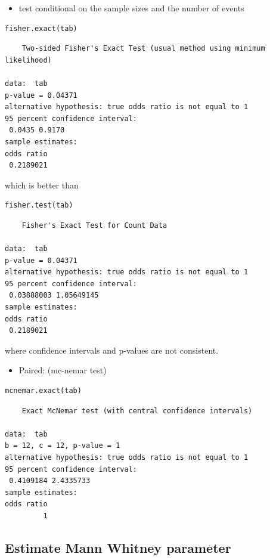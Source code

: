 \documentclass{article}
\begin{document}
\bigskip

\begin{itemize}
\item test conditional on the sample sizes and the number of events
\end{itemize}
\lstset{language=r,label= ,caption= ,captionpos=b,numbers=none}
\begin{lstlisting}
fisher.exact(tab)
\end{lstlisting}

\begin{verbatim}
	Two-sided Fisher's Exact Test (usual method using minimum likelihood)

data:  tab
p-value = 0.04371
alternative hypothesis: true odds ratio is not equal to 1
95 percent confidence interval:
 0.0435 0.9170
sample estimates:
odds ratio 
 0.2189021
\end{verbatim}

which is better than
\lstset{language=r,label= ,caption= ,captionpos=b,numbers=none}
\begin{lstlisting}
fisher.test(tab)
\end{lstlisting}

\begin{verbatim}
	Fisher's Exact Test for Count Data

data:  tab
p-value = 0.04371
alternative hypothesis: true odds ratio is not equal to 1
95 percent confidence interval:
 0.03888003 1.05649145
sample estimates:
odds ratio 
 0.2189021
\end{verbatim}
where confidence intervals and p-values are not consistent.

\bigskip

\begin{itemize}
\item Paired: (mc-nemar test)
\end{itemize}
\lstset{language=r,label= ,caption= ,captionpos=b,numbers=none}
\begin{lstlisting}
mcnemar.exact(tab)
\end{lstlisting}

\begin{verbatim}
	Exact McNemar test (with central confidence intervals)

data:  tab
b = 12, c = 12, p-value = 1
alternative hypothesis: true odds ratio is not equal to 1
95 percent confidence interval:
 0.4109184 2.4335733
sample estimates:
odds ratio 
         1
\end{verbatim}

\subsection{Estimate Mann Whitney parameter}
\label{sec:orgcc0bd52}
\end{document}
